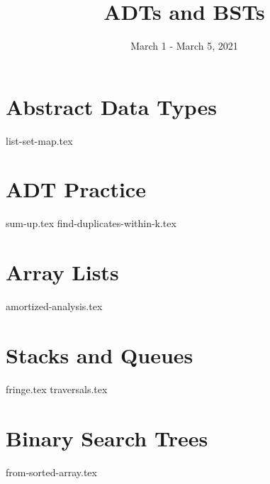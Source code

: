 \documentclass[11pt]{exam}
\title{ADTs and BSTs}
\date{March 1 - March 5, 2021}
\begin{document}
\maketitle


\section{Abstract Data Types}
{list-set-map.tex}
\clearpage

\section{ADT Practice}
\begin{questions}
{sum-up.tex}
{find-duplicates-within-k.tex}
\end{questions}

\section{Array Lists}
\begin{questions}
{amortized-analysis.tex}
\end{questions}
\clearpage

\section{Stacks and Queues}
\begin{questions}
{fringe.tex}
{traversals.tex}
\end{questions}
\clearpage

\section{Binary Search Trees}
\begin{questions}
{from-sorted-array.tex}
\end{questions}
\clearpage
\end{document}
